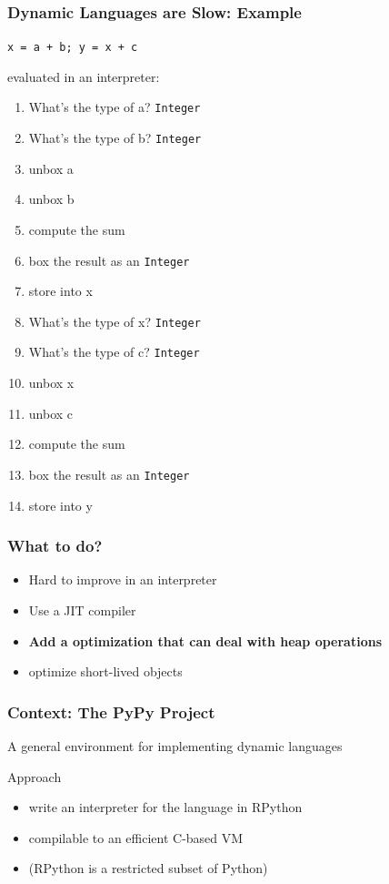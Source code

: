\documentclass[utf8x]{beamer}
\begin{document}
\begin{frame}
  \frametitle{Dynamic Languages are Slow: Example}
  \texttt{x = a + b; y = x + c}

  evaluated in an interpreter:
  \pause
  \begin{enumerate}
      \item What's the type of a? \texttt{Integer}
      \item What's the type of b? \texttt{Integer}
  \pause
      \item unbox a
      \item unbox b
      \item compute the sum
      \item box the result as an \texttt{Integer}
      \item store into x
  \pause
      \item What's the type of x? \texttt{Integer}
      \item What's the type of c? \texttt{Integer}
  \pause
      \item unbox x
      \item unbox c
      \item compute the sum
      \item box the result as an \texttt{Integer}
      \item store into y
  \end{enumerate}
\end{frame}

\begin{frame}
  \frametitle{What to do?}
  \begin{itemize}
      \item Hard to improve in an interpreter
      \item Use a JIT compiler
      \item \textbf{Add a optimization that can deal with heap operations}
      \pause
      \item optimize short-lived objects
  \end{itemize}
\end{frame}

\begin{frame}
  \frametitle{Context: The PyPy Project}
  A general environment for implementing dynamic languages
  \pause
  \begin{block}{Approach}
      \begin{itemize}
          \item write an interpreter for the language in RPython
          \item compilable to an efficient C-based VM
          \pause
          \item (RPython is a restricted subset of Python)
      \end{itemize}
  \end{block}
\end{frame}
\end{document}
